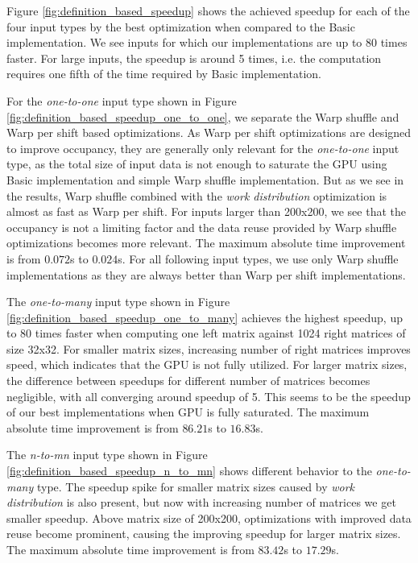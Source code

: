 Figure \ref{fig:definition_based_speedup} shows the achieved speedup for each of the four input types by the best optimization when compared to the Basic implementation. We see inputs for which our implementations are up to 80 times faster. For large inputs, the speedup is around 5 times, i.e. the computation requires one fifth of the time required by Basic implementation.

For the \textit{one-to-one} input type shown in Figure \ref{fig:definition_based_speedup_one_to_one}, we separate the Warp shuffle and Warp per shift based optimizations. As Warp per shift optimizations are designed to improve occupancy, they are generally only relevant for the \textit{one-to-one} input type, as the total size of input data is not enough  to saturate the GPU using Basic implementation and simple Warp shuffle implementation. But as we see in the results, Warp shuffle combined with the \textit{work distribution} optimization is almost as fast as Warp per shift. For inputs larger than 200x200, we see that the occupancy is not a limiting factor and the data reuse provided by Warp shuffle optimizations becomes more relevant. The maximum absolute time improvement is from $0.072$s to $0.024$s. For all following input types, we use only Warp shuffle implementations as they are always better than Warp per shift implementations.

The \textit{one-to-many} input type shown in Figure \ref{fig:definition_based_speedup_one_to_many} achieves the highest speedup, up to 80 times faster when computing one left matrix against 1024 right matrices of size 32x32. For smaller matrix sizes, increasing number of right matrices improves speed, which indicates that the GPU is not fully utilized. For larger matrix sizes, the difference between speedups for different number of matrices becomes negligible, with all converging around speedup of 5. This seems to be the speedup of our best implementations when GPU is fully saturated. The maximum absolute time improvement is from $86.21$s to $16.83$s. 

The \textit{n-to-mn} input type shown in Figure \ref{fig:definition_based_speedup_n_to_mn} shows different behavior to the \textit{one-to-many} type. The speedup spike for smaller matrix sizes caused by \textit{work distribution} is also present, but now with increasing number of matrices we get smaller speedup. Above matrix size of 200x200, optimizations with improved data reuse become prominent, causing the improving speedup for larger matrix sizes. The maximum absolute time improvement is from $83.42$s to $17.29$s. 

